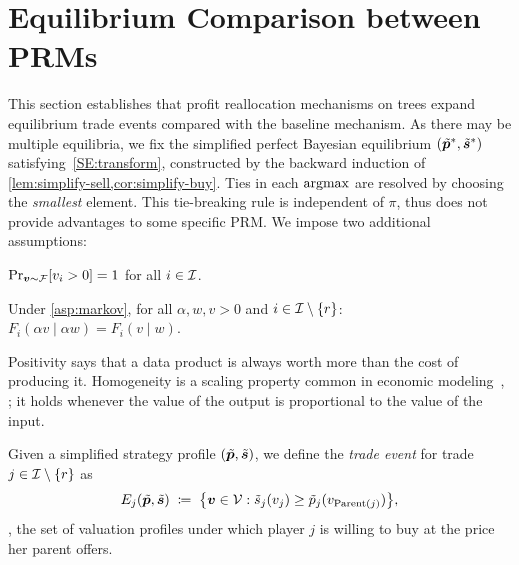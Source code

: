 \section{Equilibrium Comparison between PRMs}
\label{sec:theoretic}

This section establishes that profit reallocation mechanisms on trees expand equilibrium trade events compared with the baseline mechanism. As there may be multiple equilibria, we fix the simplified perfect Bayesian equilibrium $(\tilde{{\bm{p}}}^*, \tilde{{\bm{s}}}^*)$ satisfying~\eqref{SE:transform}, constructed by the backward induction of \cref{lem:simplify-sell,cor:simplify-buy}.
Ties in each $\operatorname*{argmax}$ are resolved by choosing the \emph{smallest} element. This tie-breaking rule is independent of $\pi$, thus does not provide advantages to some specific PRM. We impose two additional assumptions:

\begin{assumption}[Positivity]
\label{asp:posi}
$\Pr_{{\bm{v}} \sim \mathcal{F}}[v_i > 0] = 1$ for all $i \in \mathcal{I}$.
\end{assumption}

\begin{assumption}[Homogeneity]
\label{asp:homo}
Under \cref{asp:markov}, for all $\alpha, w, v > 0$ and $i \in \mathcal{I} \setminus \{r\}$: $F_i(\alpha v \mid \alpha w) = F_i(v \mid w)$.
\end{assumption}

Positivity says that a data product is always worth more than the cost of producing it. Homogeneity is a scaling property common in economic modeling~\citep[\S6.2]{AGT:nisan_algorithmic_2007}, \citep[\S3.2.3]{DSGE}; it holds whenever the value of the output is proportional to the value of the input.

Given a simplified strategy profile $(\tilde{{\bm{p}}}, \tilde{{\bm{s}}})$, we define the \emph{trade event} for trade $j \in \mathcal{I} \setminus \{r\}$ as
\begin{equation}
\label{eq:trade-event}
E_j(\tilde{{\bm{p}}}, \tilde{{\bm{s}}}) \;\coloneqq\; \big\{{\bm{v}} \in \mathcal{V} : \tilde{s}_j(v_j) \ge \tilde{p}_j(v_{\operatorname{Parent}(j)})\big\},
\end{equation}
\ie, the set of valuation profiles under which player $j$ is willing to buy at the price her parent offers.



